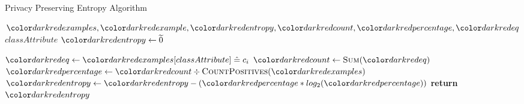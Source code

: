 \begin{algorithm}[H]
\caption{Privacy Preserving Entropy Algorithm}\label{a:id3-entropy-pp}
\begin{algorithmic}[1]
\Require $\red{examples}, \red{example}, \red{entropy}, \red{count}, \red{percentage}, \red{eq}$
\renewcommand{\algorithmicrequire}{\textbf{Global Vars:}}
\Require $classAttribute$
    \State $\red{entropy} \gets \enc{0}$

        \State $\red{eq} \gets \red{examples}[classAttribute] \heq c_i$ 
        \State $\red{count} \gets \textsc{Sum}(\red{eq})$
        \State $\red{percentage} \gets \red{count} \div \textsc{CountPositives}(\red{examples})$
        \State $\red{entropy} \gets \red{entropy} - (\red{percentage} * log_2 (\red{percentage}))$
    \EndFor
    \State \textbf{return} $\red{entropy}$
\EndProcedure
\end{algorithmic}
\end{algorithm}
